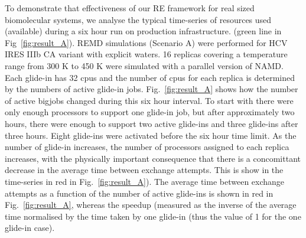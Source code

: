 \documentclass{rspublic}
\begin{document}
To demonstrate that effectiveness of our RE framework for real sized
biomolecular systems, we analyse the typical time-series of resources
used (available) during a six hour run on production infrastructure.
(green line in Fig~\ref{fig:result_A}).  REMD simulations (Scenario
A) were performed for HCV IRES IIIb CA variant with explicit
waters. 16 replicas covering a temperature range from 300 K to 450 K
were simulated with a parallel version of NAMD.  Each glide-in has 32
cpus and the number of cpus for each replica is determined by the
numbers of active glide-in jobs.  Fig.~\ref{fig:result_A} shows how
the number of active bigjobs changed during this six hour interval. To
start with there were only enough processors to support one glide-in
job, but after approximately two hours, there were enough to support
two active glide-ins and three glide-ins after three hours. Eight
glide-ins were activated before the six hour time limit. As the number
of glide-in increases, the number of processors assigned to each
replica increases, with the physically important consequence that
there is a concomittant decrease in the average time between exchange
attempts. This is show in the time-series in red in
Fig.~\ref{fig:result_A}).  The average time between exchange
attempts as a function of the number of active glide-ins is shown in
red in Fig.~\ref{fig:result_A}, whereas the speedup (measured as
the inverse of the average time normalised by the time taken by one
glide-in (thus the value of 1 for the one glide-in case).
\end{document}
